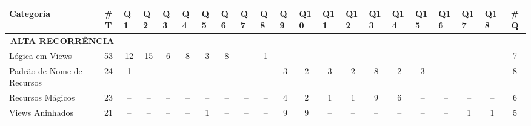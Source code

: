 \begin{table*}[t]
\centering
\footnotesize
\begin{tabular}{@{}p{3.8cm}p{0.3cm}p{.2cm}p{.2cm}p{.2cm}p{.2cm}p{.2cm}p{.2cm}p{.2cm}p{.2cm}p{.2cm}p{.4cm}p{.4cm}p{.4cm}p{.4cm}p{.4cm}p{.4cm}p{.4cm}p{.4cm}p{.4cm}p{0.2cm}@{}}
\toprule
\textbf{Categoria} & \multicolumn{1}{c}{\textbf{\#T}} & Q1 & Q2 & Q3 & Q4 & Q5 & Q6 & Q7 & Q8 & Q9 & Q10 & Q11 & Q12 & Q13 & Q14 & Q15 & Q16 & Q17 & Q18 &  \multicolumn{1}{c}{\textbf{\#Q}} \\
\hline
\multicolumn{2}{c}{\scriptsize{\textbf{ALTA RECORR\^ENCIA}}} \\
L\'ogica em Views							& \multicolumn{1}{c}{53} 	& \multicolumn{1}{c}{12} 	& \multicolumn{1}{c}{15} 	& \multicolumn{1}{c}{6} 	& \multicolumn{1}{c}{8} 	& \multicolumn{1}{c}{3} 	& \multicolumn{1}{c}{8} 	& \multicolumn{1}{c}{--} 	& \multicolumn{1}{c}{1} 	& \multicolumn{1}{c}{--} 	& \multicolumn{1}{c}{--} 	& \multicolumn{1}{c}{--} 	& \multicolumn{1}{c}{--} 	& \multicolumn{1}{c}{--} 	& \multicolumn{1}{c}{--} 	& \multicolumn{1}{c}{--} 	& \multicolumn{1}{c}{--} 	& \multicolumn{1}{c}{--} 	& \multicolumn{1}{c}{--} 	& \multicolumn{1}{c}{7} \\	
Padr\~ao de Nome de Recursos				& \multicolumn{1}{c}{24} 	& \multicolumn{1}{c}{1} 	& \multicolumn{1}{c}{--} 	& \multicolumn{1}{c}{--} 	& \multicolumn{1}{c}{--} 	& \multicolumn{1}{c}{--} 	& \multicolumn{1}{c}{--} 	& \multicolumn{1}{c}{--} 	& \multicolumn{1}{c}{--} 	& \multicolumn{1}{c}{3} 	& \multicolumn{1}{c}{2} 	& \multicolumn{1}{c}{3} 	& \multicolumn{1}{c}{2} 	& \multicolumn{1}{c}{8} 	& \multicolumn{1}{c}{2} 	& \multicolumn{1}{c}{3} 	& \multicolumn{1}{c}{--} 	& \multicolumn{1}{c}{--} 	& \multicolumn{1}{c}{--} 	& \multicolumn{1}{c}{8} \\	
Recursos M\'agicos							& \multicolumn{1}{c}{23} 	& \multicolumn{1}{c}{--} 	& \multicolumn{1}{c}{--} 	& \multicolumn{1}{c}{--} 	& \multicolumn{1}{c}{--} 	& \multicolumn{1}{c}{--} 	& \multicolumn{1}{c}{--} 	& \multicolumn{1}{c}{--} 	& \multicolumn{1}{c}{--} 	& \multicolumn{1}{c}{4} 	& \multicolumn{1}{c}{2} 	& \multicolumn{1}{c}{1} 	& \multicolumn{1}{c}{1} 	& \multicolumn{1}{c}{9} 	& \multicolumn{1}{c}{6} 	& \multicolumn{1}{c}{--} 	& \multicolumn{1}{c}{--} 	& \multicolumn{1}{c}{--} 	& \multicolumn{1}{c}{--} 	& \multicolumn{1}{c}{6} \\	
Views Aninhados								& \multicolumn{1}{c}{21} 	& \multicolumn{1}{c}{--} 	& \multicolumn{1}{c}{--} 	& \multicolumn{1}{c}{--} 	& \multicolumn{1}{c}{--} 	& \multicolumn{1}{c}{1} 	& \multicolumn{1}{c}{--} 	& \multicolumn{1}{c}{--} 	& \multicolumn{1}{c}{--} 	& \multicolumn{1}{c}{9} 	& \multicolumn{1}{c}{9} 	& \multicolumn{1}{c}{--} 	& \multicolumn{1}{c}{--} 	& \multicolumn{1}{c}{--} 	& \multicolumn{1}{c}{--} 	& \multicolumn{1}{c}{--} 	& \multicolumn{1}{c}{--} 	& \multicolumn{1}{c}{1} 	& \multicolumn{1}{c}{1} 	& \multicolumn{1}{c}{5} \\	


\end{tabular}
\end{table*}
